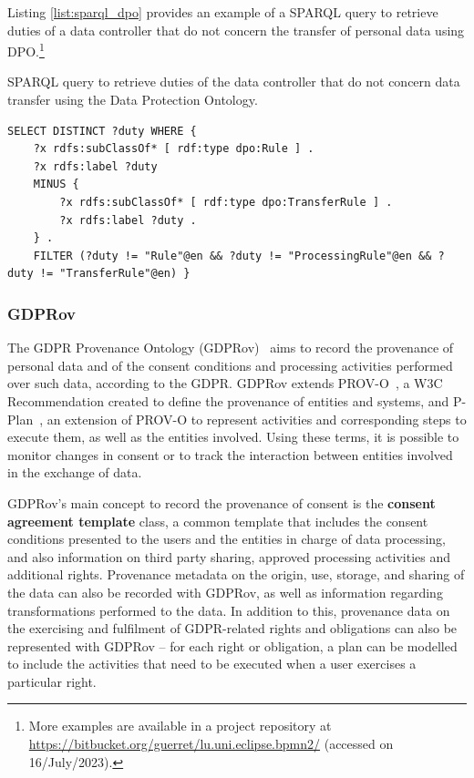 Listing \ref{list:sparql_dpo} provides an example of a SPARQL query to retrieve duties of a data controller that do not concern the transfer of personal data using DPO.\footnote{More examples are available in a project repository at \url{https://bitbucket.org/guerret/lu.uni.eclipse.bpmn2/} (accessed on 16/July/2023).}

\begin{listing}[ht]
\caption{SPARQL query to retrieve duties of the data controller that do not concern data transfer using the Data Protection Ontology.}
\label{list:sparql_dpo}
\begin{verbatim}
SELECT DISTINCT ?duty WHERE {
    ?x rdfs:subClassOf* [ rdf:type dpo:Rule ] .
	?x rdfs:label ?duty
	MINUS {
		?x rdfs:subClassOf* [ rdf:type dpo:TransferRule ] .
		?x rdfs:label ?duty .
	} .
	FILTER (?duty != "Rule"@en && ?duty != "ProcessingRule"@en && ?duty != "TransferRule"@en) }
\end{verbatim}
\end{listing}

\subsubsection{GDPRov}
\label{sec:gdprov}

The GDPR Provenance Ontology (GDPRov)~\citep{pandit_modelling_2017} aims to record the provenance of personal data and of the consent conditions and processing activities performed over such data, according to the GDPR.
GDPRov extends PROV-O~\citep{lebo_prov-o_2013}, a W3C Recommendation created to define the provenance of entities and systems, and P-Plan~\citep{garijo_augmenting_2012}, an extension of PROV-O to represent activities and corresponding steps to execute them, as well as the entities involved.
Using these terms, it is possible to monitor changes in consent or to track the interaction between entities involved in the exchange of data.

GDPRov's main concept to record the provenance of consent is the \textbf{consent agreement template} class, a common template that includes the consent conditions presented to the users and the entities in charge of data processing, and also information on third party sharing, approved processing activities and additional rights.
Provenance metadata on the origin, use, storage, and sharing of the data can also be recorded with GDPRov, as well as information regarding transformations performed to the data.
In addition to this, provenance data on the exercising and fulfilment of GDPR-related rights and obligations can also be represented with GDPRov -- for each right or obligation, a plan can be modelled to include the activities that need to be executed when a user exercises a particular right.

